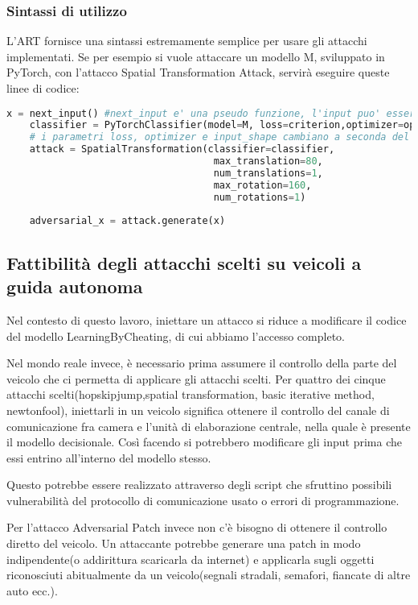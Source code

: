 \subsubsection{Sintassi di utilizzo}
L'ART fornisce una sintassi estremamente semplice per usare gli attacchi implementati. Se per esempio si vuole attaccare un modello M, sviluppato in PyTorch, con l'attacco Spatial
Transformation Attack, servirà eseguire queste linee di codice:\begin{lstlisting}[language=Python]
    x = next_input() #next_input e' una pseudo funzione, l'input puo' essere ottenuto in vari modi
    classifier = PyTorchClassifier(model=M, loss=criterion,optimizer=optimizer, input_shape=(3, 160, 384)) 
    # i parametri loss, optimizer e input_shape cambiano a seconda del modello
    attack = SpatialTransformation(classifier=classifier,
                                    max_translation=80,
                                    num_translations=1,
                                    max_rotation=160,
                                    num_rotations=1)
    
    adversarial_x = attack.generate(x)
\end{lstlisting}

\subsection{Fattibilità degli attacchi scelti su veicoli a guida autonoma}
Nel contesto di questo lavoro, iniettare un attacco si riduce a modificare il codice del modello LearningByCheating, di cui abbiamo l'accesso completo. 

Nel  mondo reale invece, è necessario prima assumere il controllo della parte del  veicolo che ci permetta di applicare gli attacchi scelti.
Per quattro dei cinque attacchi scelti(hopskipjump,spatial transformation, basic iterative method, newtonfool), iniettarli in un veicolo significa ottenere il controllo del canale
di comunicazione fra camera e l'unità di elaborazione centrale, nella quale è presente il modello decisionale. Così facendo si potrebbero  modificare gli input prima che essi entrino
all'interno del modello stesso.

Questo potrebbe essere realizzato attraverso degli script che sfruttino possibili vulnerabilità del protocollo di comunicazione usato o errori di programmazione.

Per l'attacco Adversarial Patch invece non c'è bisogno  di ottenere il controllo diretto del veicolo. Un attaccante potrebbe generare
una patch in modo indipendente(o addirittura scaricarla da internet) e applicarla sugli oggetti riconosciuti abitualmente da un veicolo(segnali stradali, semafori, fiancate di altre auto ecc.).
